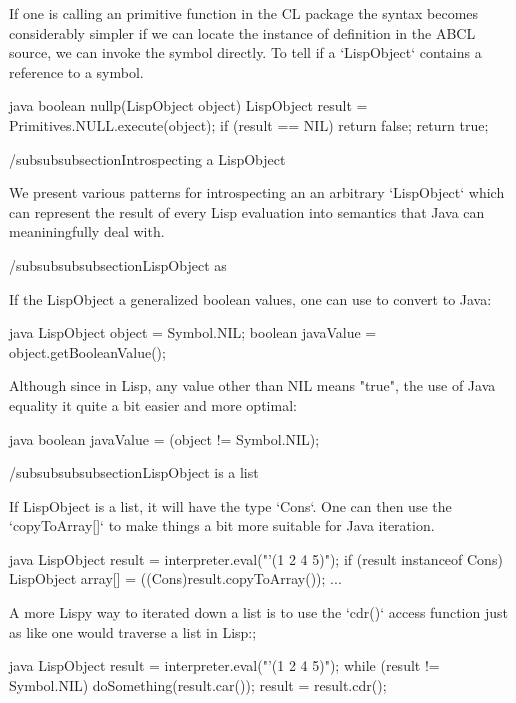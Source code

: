 \documentclass[10pt]{article}
\begin{document}
If one is calling an primitive function in the CL package the syntax
becomes considerably simpler if we can locate the instance of
definition in the ABCL source, we can invoke the symbol directly.  To
tell if a `LispObject` contains a reference to a symbol.

\begin{code}{java}   
    boolean nullp(LispObject object) {
      LispObject result = Primitives.NULL.execute(object);
      if (result == NIL) {
        return false;
      }
      return true;
   }

\end{code}

/subsubsubsection{Introspecting a LispObject}

We present various patterns for introspecting an an arbitrary
`LispObject` which can represent the result of every Lisp evaluation
into semantics that Java can meaniningfully deal with.

/subsubsubsubsection{LispObject as }

If the LispObject a generalized boolean values, one can use
 to convert to Java:

\begin{code}{java}
     LispObject object = Symbol.NIL;
     boolean javaValue = object.getBooleanValue();
\end{code}

Although since in Lisp, any value other than NIL means "true", the
use of Java equality it quite a bit easier and more optimal:

\begin{code}{java}
    boolean javaValue = (object != Symbol.NIL);
\end{code}

/subsubsubsubsection{LispObject is a list}

If LispObject is a list, it will have the type `Cons`.  One can then use
the `copyToArray[]` to make things a bit more suitable for Java
iteration.

\begin{code}{java}
    LispObject result = interpreter.eval("'(1 2 4 5)");
    if (result instanceof Cons) {
      LispObject array[] = ((Cons)result.copyToArray());
      ...
    }
\end{code}
    
A more Lispy way to iterated down a list is to use the `cdr()` access
function just as like one would traverse a list in Lisp:;

\begin{code}{java}
    LispObject result = interpreter.eval("'(1 2 4 5)");
    while (result != Symbol.NIL) {
      doSomething(result.car());
      result = result.cdr();
    }
\end{code}
\end{document}
